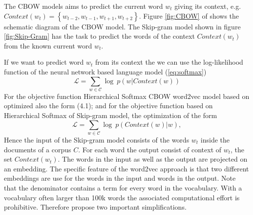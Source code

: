 The CBOW models aims to predict the current word $w_t$ giving its context, e.g. $Context(w_t)=\left\{w_{t-2},w_{t-1},w_{t+1},w_{t+2}\right\}$. Figure \ref{fig:CBOW} of
\cite{MikolovSutskeverEtAl2013} shows the schematic diagram of the CBOW model.
The Skip-gram model shown in figure \ref{fig:Skip-Gram} has the task to predict the words of the context  $Context(w_t)$ from the known current word  $w_t$. 

If we want to predict word $w_t$ from its context the we can use the 
log-likelihood function of the neural network based language model (\ref{eq:softmax}) 
\begin{equation}
\mathcal{L}=\sum_{w\in\mathcal{C}}\log\ p(w|Context(w)) 
\end{equation}
For the objective function Hierarchical Softmax CBOW word2vec model based on optimized also the form (4.1); and for the objective function based on Hierarchical Softmax of Skip-gram model, the optimization of the form
\begin{equation}
\mathcal{L}=\sum_{w\in\mathcal{C}}\log\ p(Context(w)|w), 
\end{equation}
Hence the input of the Skip-gram model consists of the words $w_t$ inside the documents of a corpus $C$. For each word the output consist of context of $w_t$, the set $Context(w_t)$. The words in the input as well as the output are projected on an embedding. The specific feature of the word2vec approach is that two different embeddings are use for the words in the input and words in the output.
Note that the denominator contains a term for every word in the vocabulary. With a vocabulary often larger than 100k words the associated computational effort is prohibitive. Therefore \cite{MikolovSutskeverEtAl2013} propose two important simplifications.
